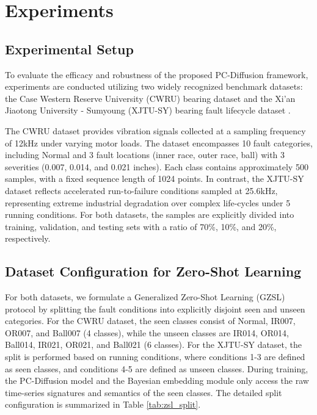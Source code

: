 \documentclass[journal]{IEEEtran}
\begin{document}
\section{Experiments}
\label{sec:experiments}

\subsection{Experimental Setup}
To evaluate the efficacy and robustness of the proposed PC-Diffusion framework, experiments are conducted utilizing two widely recognized benchmark datasets: the Case Western Reserve University (CWRU) bearing dataset \cite{cwru2023bearing} and the Xi'an Jiaotong University - Sumyoung (XJTU-SY) bearing fault lifecycle dataset \cite{wang2018xjtu}. 

The CWRU dataset provides vibration signals collected at a sampling frequency of 12kHz under varying motor loads. The dataset encompasses 10 fault categories, including Normal and 3 fault locations (inner race, outer race, ball) with 3 severities (0.007, 0.014, and 0.021 inches). Each class contains approximately 500 samples, with a fixed sequence length of 1024 points. In contrast, the XJTU-SY dataset reflects accelerated run-to-failure conditions sampled at 25.6kHz, representing extreme industrial degradation over complex life-cycles under 5 running conditions. For both datasets, the samples are explicitly divided into training, validation, and testing sets with a ratio of 70\%, 10\%, and 20\%, respectively.

\subsection{Dataset Configuration for Zero-Shot Learning}
For both datasets, we formulate a Generalized Zero-Shot Learning (GZSL) protocol by splitting the fault conditions into explicitly disjoint seen and unseen categories. For the CWRU dataset, the seen classes consist of Normal, IR007, OR007, and Ball007 (4 classes), while the unseen classes are IR014, OR014, Ball014, IR021, OR021, and Ball021 (6 classes). For the XJTU-SY dataset, the split is performed based on running conditions, where conditions 1-3 are defined as seen classes, and conditions 4-5 are defined as unseen classes. During training, the PC-Diffusion model and the Bayesian embedding module only access the raw time-series signatures and semantics of the seen classes. The detailed split configuration is summarized in Table \ref{tab:zsl_split}.
\end{document}
